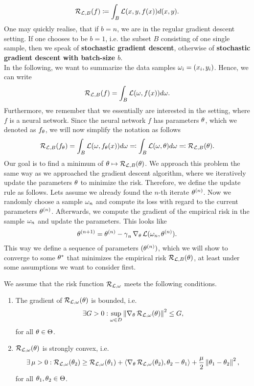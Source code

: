 \begin{align*}
\operatorname{\mathcal{R}}_{\operatorname{\mathcal{L}},B}(f) \coloneqq \int_{B}\operatorname{\mathcal{L}}(x, y, f(x)) d(x,y).
\end{align*}
One may quickly realise, that if $b=n$, we are in the regular gradient descent setting. If one chooses to be $b=1$, i.e. the subset $B$ consisting of one single sample, then we speak of \textbf{stochastic gradient descent}, otherwise of \textbf{stochastic gradient descent with batch-size $b$}.\\
In the following, we want to summarize the data samples $\omega_i=(x_i,y_i)$. Hence, we can write
\begin{align*}
\operatorname{\mathcal{R}}_{\operatorname{\mathcal{L}},B}(f) = \int_{B}\operatorname{\mathcal{L}}(\omega, f(x)) d\omega.
\end{align*}
Furthermore, we remember that we essentially are interested in the setting, where $f$ is a neural network. Since the neural network $f$ has parameters $\theta$, which we denoted as $f_{\theta}$, we will now simplify the notation as follows
\begin{align*}
\operatorname{\mathcal{R}}_{\operatorname{\mathcal{L}},B}(f_{\theta}) = \int_{B}\operatorname{\mathcal{L}}(\omega, f_{\theta}(x)) d\omega \eqqcolon \int_{B}\operatorname{\mathcal{L}}(\omega,\theta) d\omega \eqqcolon \operatorname{\mathcal{R}}_{\operatorname{\mathcal{L}},B}(\theta).
\end{align*}
Our goal is to find a minimum of $\theta \mapsto\operatorname{\mathcal{R}}_{\operatorname{\mathcal{L}},B} (\theta)$. We approach this problem the same way as we approached the gradient descent algorithm, where we iteratively update the parameters $\theta$ to minimize the risk. Therefore, we define the update rule as follows. Lets assume we already found the $n$-th iterate $\theta^{(n)}$. Now we randomly choose a sample $\omega_n$ and compute its loss with regard to the current parameters $\theta^{(n)}$. Afterwards, we compute the gradient of the empirical risk in the sample $\omega_n$ and update the parameters. This looks like
\begin{align}\label{eq:sgd}
\theta^{(n+1)} = \theta^{(n)} -\operatorname{\gamma}_n \nabla_{\theta} \operatorname{\mathcal{L}}(\omega_n,\theta^{(n)}).
\end{align}
This way we define a sequence of parameters $(\theta^{(n)})$, which we will show to converge to some $\theta^{\ast}$ that minimizes the empirical risk $\operatorname{\mathcal{R}}_{\operatorname{\mathcal{L}},B}(\theta)$, at least under some assumptions we want to consider first.
\begin{assumption}\label{ass:sgd}
We assume that the risk function $\operatorname{\mathcal{R}}_{\operatorname{\mathcal{L}},\omega}$ meets the following conditions.
\begin{enumerate}
\item The gradient of $\operatorname{\mathcal{R}}_{\operatorname{\mathcal{L}},\omega}(\theta)$ is bounded, i.e.
\begin{align}\label{eq:ass1}
\exists G > 0: \sup_{\omega\in D} \left\| \nabla_{\theta} \operatorname{\mathcal{R}}_{\operatorname{\mathcal{L}},\omega}(\theta) \right\|^2 \leq G,
\end{align}
for all $\theta\in\operatorname{\Theta}$.
\item $\operatorname{\mathcal{R}}_{\operatorname{\mathcal{L}},\omega}(\theta)$ is strongly convex, i.e.
\begin{align}\label{eq:ass2}
\exists \operatorname{\mu}>0: \operatorname{\mathcal{R}}_{\operatorname{\mathcal{L}},\omega}(\theta_2) \geq \operatorname{\mathcal{R}}_{\operatorname{\mathcal{L}},\omega}(\theta_1) + \left\langle \nabla_{\theta} \operatorname{\mathcal{R}}_{\operatorname{\mathcal{L}},\omega}(\theta_2), \theta_2-\theta_1 \right\rangle + \frac{\operatorname{\mu}}{2} \left\| \theta_1 - \theta_2 \right\|^2,
\end{align}
for all $\theta_1,\theta_2 \in\operatorname{\Theta}$.
\end{enumerate}
\end{assumption}
